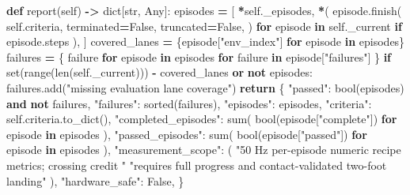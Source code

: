 \documentclass[
  american,
  11pt,
  letterpaper,
]{article}
\newenvironment{Shaded}{\begin{snugshade}}{\end{snugshade}}
\newcommand{\BuiltInTok}[1]{#1}
\newcommand{\ControlFlowTok}[1]{\textcolor[rgb]{0.13,0.29,0.53}{\textbf{#1}}}
\newcommand{\KeywordTok}[1]{\textcolor[rgb]{0.13,0.29,0.53}{\textbf{#1}}}
\newcommand{\NormalTok}[1]{#1}
\newcommand{\OperatorTok}[1]{\textcolor[rgb]{0.81,0.36,0.00}{\textbf{#1}}}
\newcommand{\StringTok}[1]{\textcolor[rgb]{0.31,0.60,0.02}{#1}}
\newcommand{\VariableTok}[1]{\textcolor[rgb]{0.00,0.00,0.00}{#1}}
\renewenvironment{Shaded}{\par\smallskip}{\par\smallskip}
\begin{document}
\begin{Shaded}
\begin{Highlighting}[]
    \KeywordTok{def}\NormalTok{ report(}\VariableTok{self}\NormalTok{) }\OperatorTok{{-}\textgreater{}} \BuiltInTok{dict}\NormalTok{[}\BuiltInTok{str}\NormalTok{, Any]:}
\NormalTok{        episodes }\OperatorTok{=}\NormalTok{ [}
            \OperatorTok{*}\VariableTok{self}\NormalTok{.\_episodes,}
            \OperatorTok{*}\NormalTok{(}
\NormalTok{                episode.finish(}
                    \VariableTok{self}\NormalTok{.criteria,}
\NormalTok{                    terminated}\OperatorTok{=}\VariableTok{False}\NormalTok{,}
\NormalTok{                    truncated}\OperatorTok{=}\VariableTok{False}\NormalTok{,}
\NormalTok{                )}
                \ControlFlowTok{for}\NormalTok{ episode }\KeywordTok{in} \VariableTok{self}\NormalTok{.\_current}
                \ControlFlowTok{if}\NormalTok{ episode.steps}
\NormalTok{            ),}
\NormalTok{        ]}
\NormalTok{        covered\_lanes }\OperatorTok{=}\NormalTok{ \{episode[}\StringTok{"env\_index"}\NormalTok{] }\ControlFlowTok{for}\NormalTok{ episode }\KeywordTok{in}\NormalTok{ episodes\}}
\NormalTok{        failures }\OperatorTok{=}\NormalTok{ \{}
\NormalTok{            failure}
            \ControlFlowTok{for}\NormalTok{ episode }\KeywordTok{in}\NormalTok{ episodes}
            \ControlFlowTok{for}\NormalTok{ failure }\KeywordTok{in}\NormalTok{ episode[}\StringTok{"failures"}\NormalTok{]}
\NormalTok{        \}}
        \ControlFlowTok{if} \BuiltInTok{set}\NormalTok{(}\BuiltInTok{range}\NormalTok{(}\BuiltInTok{len}\NormalTok{(}\VariableTok{self}\NormalTok{.\_current))) }\OperatorTok{{-}}\NormalTok{ covered\_lanes }\KeywordTok{or} \KeywordTok{not}\NormalTok{ episodes:}
\NormalTok{            failures.add(}\StringTok{"missing evaluation lane coverage"}\NormalTok{)}
        \ControlFlowTok{return}\NormalTok{ \{}
            \StringTok{"passed"}\NormalTok{: }\BuiltInTok{bool}\NormalTok{(episodes) }\KeywordTok{and} \KeywordTok{not}\NormalTok{ failures,}
            \StringTok{"failures"}\NormalTok{: }\BuiltInTok{sorted}\NormalTok{(failures),}
            \StringTok{"episodes"}\NormalTok{: episodes,}
            \StringTok{"criteria"}\NormalTok{: }\VariableTok{self}\NormalTok{.criteria.to\_dict(),}
            \StringTok{"completed\_episodes"}\NormalTok{: }\BuiltInTok{sum}\NormalTok{(}
                \BuiltInTok{bool}\NormalTok{(episode[}\StringTok{"complete"}\NormalTok{]) }\ControlFlowTok{for}\NormalTok{ episode }\KeywordTok{in}\NormalTok{ episodes}
\NormalTok{            ),}
            \StringTok{"passed\_episodes"}\NormalTok{: }\BuiltInTok{sum}\NormalTok{(}
                \BuiltInTok{bool}\NormalTok{(episode[}\StringTok{"passed"}\NormalTok{]) }\ControlFlowTok{for}\NormalTok{ episode }\KeywordTok{in}\NormalTok{ episodes}
\NormalTok{            ),}
            \StringTok{"measurement\_scope"}\NormalTok{: (}
                \StringTok{"50 Hz per{-}episode numeric recipe metrics; crossing credit "}
                \StringTok{"requires full progress and contact{-}validated two{-}foot landing"}
\NormalTok{            ),}
            \StringTok{"hardware\_safe"}\NormalTok{: }\VariableTok{False}\NormalTok{,}
\NormalTok{        \}}



\end{Highlighting}
\end{Shaded}
\end{document}
